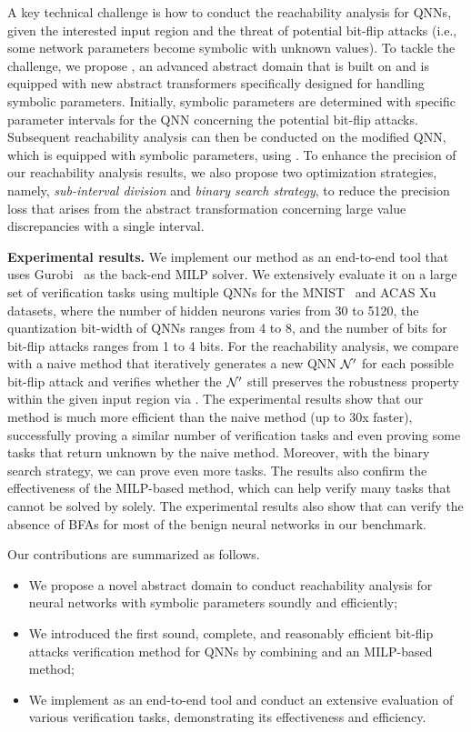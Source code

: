 A key technical challenge is how to conduct the reachability analysis for QNNs, given the interested input region and the threat of potential bit-flip attacks (i.e., some network parameters become symbolic with unknown values). To tackle the challenge, we propose \symPoly, an advanced abstract domain that is built on \deepPoly and is equipped with new abstract transformers specifically designed for handling symbolic parameters. Initially, symbolic parameters are determined with specific parameter intervals for the QNN concerning the potential bit-flip attacks. Subsequent reachability analysis can then be conducted on the modified QNN, which is equipped with symbolic parameters, using \symPoly. To enhance the precision of our reachability analysis results, we also propose two optimization strategies, namely, \emph{sub-interval division} and \emph{binary search strategy}, to reduce the precision loss that arises from the abstract transformation concerning large value discrepancies with a single interval.


\smallskip
\noindent
{\bf Experimental results.}
We implement our method as an end-to-end tool that uses Gurobi~\cite{Gurobi} as the back-end MILP solver. We extensively evaluate it on a large set of verification tasks using multiple QNNs for the MNIST~\cite{MNIST} and ACAS Xu~\cite{julian2019deep} datasets, where the number of hidden neurons varies from 30 to 5120, the quantization bit-width of QNNs ranges from 4 to 8, and the number of bits for bit-flip attacks ranges from 1 to 4 bits. For the reachability analysis, we compare \tool with a naive method that iteratively generates a new QNN ${\mathcal{N}}'$ for each possible bit-flip attack and verifies whether the ${\mathcal{N}}'$ still preserves the robustness property within the given input region via \deepPoly. The experimental results show that our method is much more efficient than the naive method (up to 30x faster), successfully proving a similar number of verification tasks and even proving some tasks that return unknown by the naive method. Moreover, with the binary search strategy, we can prove even more tasks. The results also confirm the effectiveness of the MILP-based method, which can help verify many tasks that cannot be solved by \symPoly solely. The experimental results also show that \tool can verify the absence of BFAs for most of the benign neural networks in our benchmark.

Our contributions are summarized as follows.
\begin{itemize}
    \item We propose a novel abstract domain \symPoly to conduct reachability analysis for neural networks with symbolic parameters soundly and efficiently;
    \item We introduced the first sound, complete, and reasonably efficient bit-flip attacks verification method \tool for QNNs by combining \symPoly and an MILP-based method;
    \item We implement \tool as an end-to-end tool and conduct an extensive evaluation of various verification tasks, demonstrating its effectiveness and efficiency.
\end{itemize}


